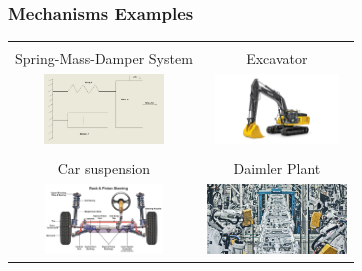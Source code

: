 \begin{frame}
	\frametitle{Mechanisms Examples}
	\begin{tabular}{|c|c|} 
	\hline  \\
	Spring-Mass-Damper System & Excavator \\
	\includegraphics[height=5em,width=10em]{figures/spring-mass-damper.jpg} & 
	\includegraphics[height=5em,width=10em]{figures/excavJohnDeere.jpg} \\
	\hline \\
	Car suspension & Daimler  Plant \\
	\includegraphics[height=5em,width=10em]{figures/carsusp.jpg} &
	\includegraphics[height=5em,width=10em]{figures/daimler_manuf.jpeg} \\
	\hline
	\end{tabular}
\end{frame}


